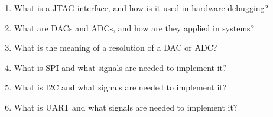 \documentclass[11pt]{article}
\begin{document}
\begin{enumerate}
    \item What is a JTAG interface, and how is it used in hardware debugging?

    \item What are DACs and ADCs, and how are they applied in systems?

    \item What is the meaning of a resolution of a DAC or ADC?

    \item What is SPI and what signals are needed to implement it?

    \item What is I2C and what signals are needed to implement it?

    \item What is UART and what signals are needed to implement it?
\end{enumerate}

\end{document}
